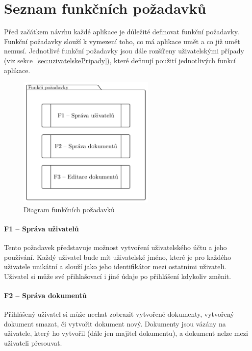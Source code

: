 
\section{Seznam funkčních požadavků}\label{sec:seznamFunkčníchPožadavků}

Před začátkem návrhu každé aplikace je důležité definovat funkční požadavky.
Funkční požadavky slouží k vymezení toho, co má aplikace umět a co již umět nemusí.
Jednotlivé funkční požadavky jsou dále rozšířeny uživatelskými případy (viz sekce~\ref{sec:uzivatelskePripady}), které definují použití jednotlivých funkcí aplikace.

\begin{figure}[ht!]
    \centering
    \includegraphics[width=0.6\textwidth]{partials/analyza/funkcniPozadavky.pdf}
    \caption{Diagram funkčních požadavků}\label{fig:funkciPozadavky}
\end{figure}

\paragraph{F1 -- Správa uživatelů}

Tento požadavek představuje možnost vytvoření uživatelského účtu a jeho používání.
Každý uživatel bude mít uživatelské jméno, které je pro každého uživatele unikátní a slouží jako jeho identifikátor mezi ostatními uživateli.
Uživatel si může své přihlašovací i jiné údaje po přihlášení kdykoliv změnit.

\paragraph{F2 -- Správa dokumentů}

Přihlášený uživatel si může nechat zobrazit vytvořené dokumenty, vytvořený dokument smazat, či vytvořit dokument nový.
Dokumenty jsou vázány na uživatele, který ho vytvořil (dále jen majitel dokumentu), a dokument nelze mezi uživateli přesouvat.


